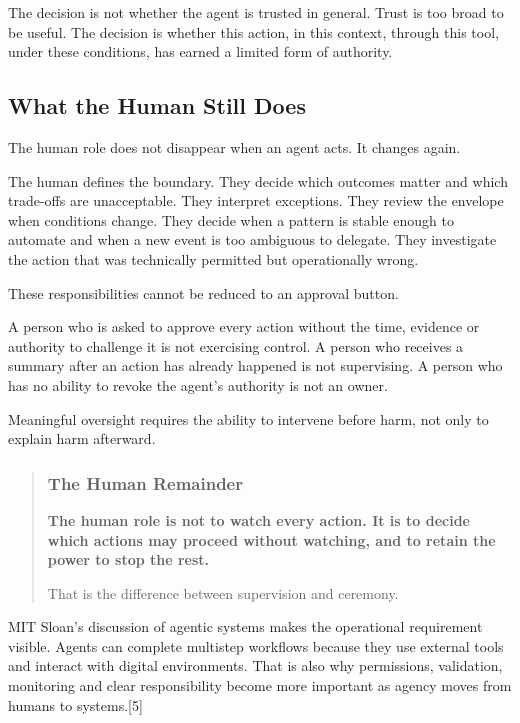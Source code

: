 The decision is not whether the agent is trusted in general. Trust is
too broad to be useful. The decision is whether this action, in this
context, through this tool, under these conditions, has earned a limited
form of authority.

\subsection{What the Human Still Does}\label{what-the-human-still-does}

The human role does not disappear when an agent acts. It changes again.

The human defines the boundary. They decide which outcomes matter and
which trade-offs are unacceptable. They interpret exceptions. They
review the envelope when conditions change. They decide when a pattern
is stable enough to automate and when a new event is too ambiguous to
delegate. They investigate the action that was technically permitted but
operationally wrong.

These responsibilities cannot be reduced to an approval button.

A person who is asked to approve every action without the time, evidence
or authority to challenge it is not exercising control. A person who
receives a summary after an action has already happened is not
supervising. A person who has no ability to revoke the agent's authority
is not an owner.

Meaningful oversight requires the ability to intervene before harm, not
only to explain harm afterward.

\begin{quote}
\subsubsection{The Human Remainder}\label{the-human-remainder}

\textbf{The human role is not to watch every action. It is to decide
which actions may proceed without watching, and to retain the power to
stop the rest.}

That is the difference between supervision and ceremony.
\end{quote}

MIT Sloan's discussion of agentic systems makes the operational
requirement visible. Agents can complete multistep workflows because
they use external tools and interact with digital environments. That is
also why permissions, validation, monitoring and clear responsibility
become more important as agency moves from humans to systems.{[}5{]}

